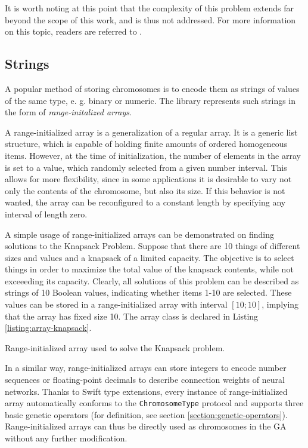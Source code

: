 It is worth noting at this point that the complexity of this problem extends far beyond the scope of this work, and is thus not addressed. For more information on this topic, readers are referred to \cite{GaPracticalHandbook}.

\subsection{Strings}\label{section:strings}
A popular method of storing chromosomes is to encode them as strings of values of the same type, e. g. binary or numeric. The library represents such strings in the form of \textit{range-initalized arrays}.

A range-initialized array is a generalization of a regular array. It is a generic list structure, which is capable of holding finite amounts of ordered homogeneous items. However, at the time of initialization, the number of elements in the array is set to a value, which randomly selected from a given number interval. This allows for more flexibility, since in some applications it is desirable to vary not only the contents of the chromosome, but also its size. If this behavior is not wanted, the array can be reconfigured to a constant length by specifying any interval of length zero.

A simple usage of range-initialized arrays can be demonstrated on finding solutions to the Knapsack Problem. Suppose that there are 10 things of different sizes and values and a knapsack of a limited capacity. The objective is to select things in order to maximize the total value of the knapsack contents, while not exceeeding its capacity. Clearly, all solutions of this problem can be described as strings of 10 Boolean values, indicating whether items 1-10 are selected. These values can be stored in a range-initialized array with interval $[10;10]$, implying that the array has fixed size 10. The array class is declared in Listing \ref{listing:array-knapsack}.

\begin{listing}[ht]
	\caption{Range-initialized array used to solve the Knapsack problem.}
	\label{listing:array-knapsack}
\end{listing}

In a similar way, range-initialized arrays can store integers to encode number sequences or floating-point decimals to describe connection weights of neural networks. Thanks to Swift type extensions, every instance of range-initialized array automatically conforms to the \texttt{ChromosomeType} protocol and supports three basic genetic operators (for definition, see section \ref{section:genetic-operators}). Range-initialized arrays can thus be directly used as chromosomes in the GA without any further modification.

